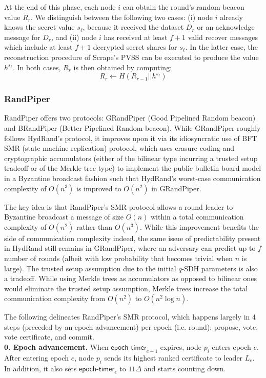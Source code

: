 \documentclass[11pt]{article}
\theoremstyle{definition}
\theoremstyle{remark}
\begin{document}
At the end of this phase, each node $i$ can obtain the round's random beacon value $R_r$. We distinguish between the following two cases: (i) node $i$ already knows the secret value $s_\ell$, because it received the dataset $D_r$ or an acknowledge message for $D_r$, and (ii) node $i$ has received at least $f + 1$ valid recover messages which include at least $f + 1$ decrypted secret shares for $s_\ell$. In the latter case, the reconstruction procedure of Scrape's PVSS can be executed to produce the value $h^{s_\ell}$. In both cases, $R_r$ is then obtained by computing:
$$R_r \leftarrow H(R_{r - 1} || h^{s_\ell})$$

\subsubsection{RandPiper}
RandPiper offers two protocols: GRandPiper (Good Pipelined Random beacon) and BRandPiper (Better Pipelined Random beacon). While GRandPiper roughly follows HydRand's protocol, it improves upon it via its idiosyncratic use of BFT SMR (state machine replication) protocol, which uses erasure coding and cryptographic accumulators (either of the bilinear type incurring a trusted setup tradeoff or of the Merkle tree type) to implement the public bulletin board model in a Byzantine broadcast fashion such that HydRand's worst-case communication complexity of $O(n^3)$ is improved to $O(n^2)$ in GRandPiper.

The key idea is that RandPiper's SMR protocol allows a round leader to Byzantine broadcast a message of size $O(n)$ within a total communication complexity of $O(n^2)$ rather than $O(n^3)$. While this improvement benefits the side of communication complexity indeed, the same issue of predictability present in HydRand still remains in GRandPiper, where an adversary can predict up to $f$ number of rounds (albeit with low probability that becomes trivial when $n$ is large). The trusted setup assumption due to the initial $q$-SDH parameters is also a tradeoff. While using Merkle trees as accumulators as opposed to bilinear ones would eliminate the trusted setup assumption, Merkle trees increase the total communication complexity from $O(n^2)$ to $O(n^2 \log n)$.

The following delineates RandPiper's SMR protocol, which happens largely in 4 steps (preceded by an epoch advancement) per epoch (i.e. round): propose, vote, vote certificate, and commit.\\

\textbf{0. Epoch advancement.} When $\mathsf{epoch\mbox{-}timer}_{e - 1}$ expires, node $p_i$ enters epoch $e$. After entering epoch $e$, node $p_i$ sends its highest ranked certificate to leader $L_e$. In addition, it also sets $\mathsf{epoch\mbox{-}timer}_e$ to $11 \Delta$ and starts counting down.\\
\end{document}
